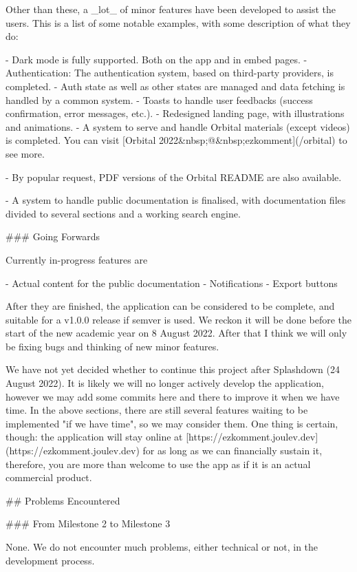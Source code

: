 \documentclass[11pt]{article}
\begin{document}
\begin{markdown}
Other than these, a _lot_ of minor features have been developed to assist the users. This is a list of some notable examples, with some description of what they do:

- Dark mode is fully supported. Both on the app and in embed pages.
- Authentication: The authentication system, based on third-party providers, is completed.
- Auth state as well as other states are managed and data fetching is handled by a common system.
- Toasts to handle user feedbacks (success confirmation, error messages, etc.).
- Redesigned landing page, with illustrations and animations.
- A system to serve and handle Orbital materials (except videos) is completed. You can visit [Orbital 2022&nbsp;@&nbsp;ezkomment](/orbital) to see more.

  - By popular request, PDF versions of the Orbital README are also available.

- A system to handle public documentation is finalised, with documentation files divided to several sections and a working search engine.

### Going Forwards

Currently in-progress features are

- Actual content for the public documentation
- Notifications
- Export buttons

After they are finished, the application can be considered to be complete, and suitable for a v1.0.0 release if semver is used. We reckon it will be done before the start of the new academic year on 8 August 2022. After that I think we will only be fixing bugs and thinking of new minor features.

We have not yet decided whether to continue this project after Splashdown (24 August 2022). It is likely we will no longer actively develop the application, however we may add some commits here and there to improve it when we have time. In the above sections, there are still several features waiting to be implemented "if we have time", so we may consider them. One thing is certain, though: the application will stay online at [https://ezkomment.joulev.dev](https://ezkomment.joulev.dev) for as long as we can financially sustain it, therefore, you are more than welcome to use the app as if it is an actual commercial product.

## Problems Encountered

### From Milestone 2 to Milestone 3

None. We do not encounter much problems, either technical or not, in the development process.


\end{markdown}
\end{document}
